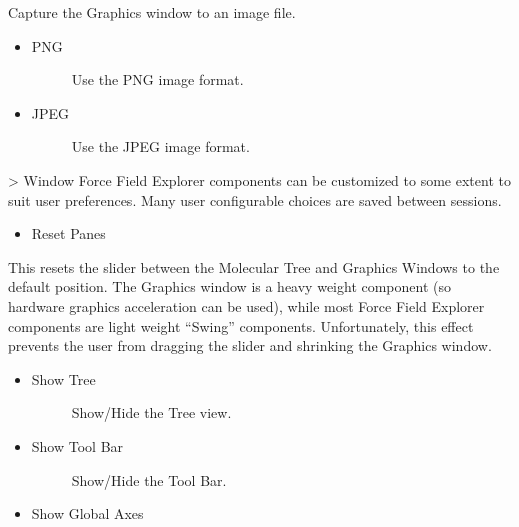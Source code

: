 \documentclass[letterpaper,11pt,english]{sphinxmanual}
\begin{document}
Capture the Graphics window to an image file.
\begin{itemize}
\item {} \begin{description}
\item[{PNG}] \leavevmode
Use the PNG image format.

\end{description}

\item {} \begin{description}
\item[{JPEG}] \leavevmode
Use the JPEG image format.

\end{description}

\end{itemize}

\textgreater{} Window
Force Field Explorer components can be customized to some extent to suit user preferences. Many user configurable choices are saved between sessions.
\begin{itemize}
\item {} 
Reset Panes

\end{itemize}

This resets the slider between the Molecular Tree and Graphics Windows to the default position. The Graphics window is a heavy weight component (so hardware graphics acceleration can be used), while most Force Field Explorer components are light weight “Swing” components. Unfortunately, this effect prevents the user from dragging the slider and shrinking the Graphics window.
\begin{itemize}
\item {} \begin{description}
\item[{Show Tree}] \leavevmode
Show/Hide the Tree view.

\end{description}

\item {} \begin{description}
\item[{Show Tool Bar}] \leavevmode
Show/Hide the Tool Bar.

\end{description}

\item {} 
Show Global Axes

\end{itemize}
\end{document}
